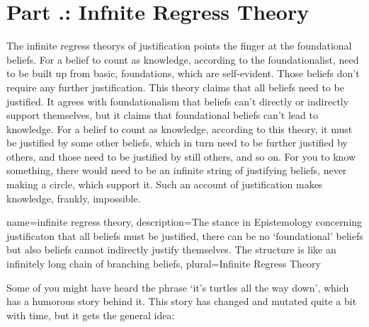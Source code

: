 \section{Part \thechapcount.\theseccount: Infnite Regress Theory}

The \glspl{infinite regress theory} of justification points the finger at the foundational beliefs. For a belief to count as knowledge, according to the foundationalist, need to be built up from basic, foundations, which are self-evident. Those beliefs don't require any further justification. This theory claims that all beliefs need to be justified. It agrees with foundationalism that beliefs can't directly or indirectly support themselves, but it claims that foundational beliefs can't lead to knowledge. For a belief to count as knowledge, according to this theory, it must be justified by some other beliefs, which in turn need to be further justified by others, and those need to be justified by still others, and so on. For you to know something, there would need to be an infinite string of justifying beliefs, never making a circle, which support it. Such an account of justification makes knowledge, frankly, impossible.

{
name=infinite regress theory,
description={The stance in Epistemology concerning justificaton that all beliefs must be justified, there can be no `foundational' beliefs but also beliefs cannot indirectly justify themselves. The structure is like an infinitely long chain of branching beliefs},
plural=Infinite Regress Theory
}


Some of you might have heard the phrase `it's turtles all the way down', which has a humorous story behind it.  This story has changed and mutated quite a bit with time, but it gets the general idea:


